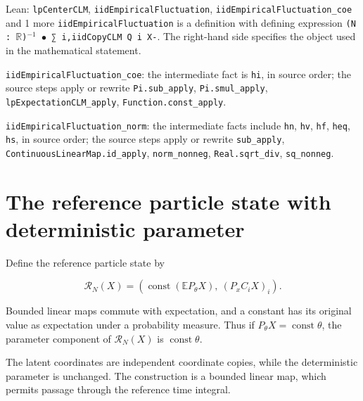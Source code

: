 \documentclass[11pt,a4paper]{article}
\begin{document}
\begin{leanbox}{Lean: \texttt{lpCenterCLM}, \texttt{iidEmpiricalFluctuation}, \texttt{iidEmpiricalFluctuation\_\allowbreak{}coe} and 1 more}
\texttt{iid\allowbreak{}Empirical\allowbreak{}Fluctuation} is a definition with defining expression \texttt{(N : \ensuremath{\mathbb R})\ensuremath{{}^{-1}} \ensuremath{\bullet} ∑ i,iid\allowbreak{}Copy\allowbreak{}CLM Q i X-\allowbreak{}}. The right-hand side specifies the object used in the mathematical statement.



\texttt{iid\allowbreak{}Empirical\allowbreak{}Fluctuation\_\allowbreak{}coe}: the intermediate fact is \texttt{hi}, in source order; the source steps apply or rewrite \texttt{Pi.\allowbreak{}sub\_\allowbreak{}apply}, \texttt{Pi.\allowbreak{}smul\_\allowbreak{}apply}, \texttt{lp\allowbreak{}Expectation\allowbreak{}CLM\_\allowbreak{}apply}, \texttt{Function.\allowbreak{}const\_\allowbreak{}apply}.



\texttt{iid\allowbreak{}Empirical\allowbreak{}Fluctuation\_\allowbreak{}norm}: the intermediate facts include \texttt{hn}, \texttt{hv}, \texttt{hf}, \texttt{heq}, \texttt{hs}, in source order; the source steps apply or rewrite \texttt{sub\_\allowbreak{}apply}, \texttt{Continuous\allowbreak{}Linear\allowbreak{}Map.\allowbreak{}id\_\allowbreak{}apply}, \texttt{norm\_\allowbreak{}nonneg}, \texttt{Real.\allowbreak{}sqrt\_\allowbreak{}div}, \texttt{sq\_\allowbreak{}nonneg}.
\end{leanbox}

\section{\texorpdfstring{The reference particle state with deterministic parameter}{The reference particle state with deterministic parameter}}


Define the reference particle state by

\[\mathcal R_N(X)=\left(\operatorname{const}(\mathbb E P_\theta X),\ (P_xC_iX)_i\right).\]

Bounded linear maps commute with expectation, and a constant has its original value as expectation under a probability measure. Thus if \(P_\theta X=\operatorname{const}\theta\), the parameter component of \(\mathcal R_N(X)\) is \(\operatorname{const}\theta\).



The latent coordinates are independent coordinate copies, while the deterministic parameter is unchanged. The construction is a bounded linear map, which permits passage through the reference time integral.
\end{document}
